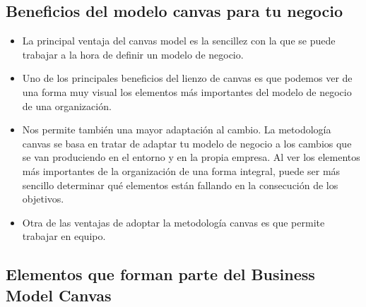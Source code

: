 \documentclass[preprint,12pt]{elsarticle}
\begin{document}
\subsection{Beneficios del modelo canvas para tu negocio}
\begin{itemize}	
\item La principal ventaja del canvas model es la sencillez con la que se puede trabajar a la hora de definir un modelo de negocio.
\item Uno de los principales beneficios del lienzo de canvas es que podemos ver de una forma muy visual los elementos más importantes del modelo de negocio de una organización.
\item Nos permite también una mayor adaptación al cambio. La metodología canvas se basa en tratar de adaptar tu modelo de negocio a los cambios que se van produciendo en el entorno y en la propia empresa. Al ver los elementos más importantes de la organización de una forma integral, puede ser más sencillo determinar qué elementos están fallando en la consecución de los objetivos.
\item Otra de las ventajas de adoptar la metodología canvas es que permite trabajar en equipo.
\end{itemize}

\subsection{Elementos que forman parte del Business Model Canvas}
\end{document}
